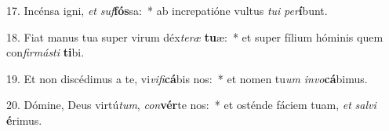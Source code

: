 17. Incénsa igni, \textit{et} \textit{suf}\textbf{fós}sa:~*  ab increpatióne vultus \textit{tu}\textit{i} \textit{per}\textbf{í}bunt.\

18. Fiat manus tua super virum déx\textit{te}\textit{ræ} \textbf{tu}æ:~*  et super fílium hóminis quem con\textit{fir}\textit{más}\textit{ti} \textbf{ti}bi.\

19. Et non discédimus a te, vi\textit{vi}\textit{fi}\textbf{cá}bis nos:~*  et nomen tu\textit{um} \textit{in}\textit{vo}\textbf{cá}bimus.\

20. Dómine, Deus virtú\textit{tum}, \textit{con}\textbf{vér}te nos:~*  et osténde fáciem tuam, \textit{et} \textit{sal}\textit{vi} \textbf{é}rimus.\

